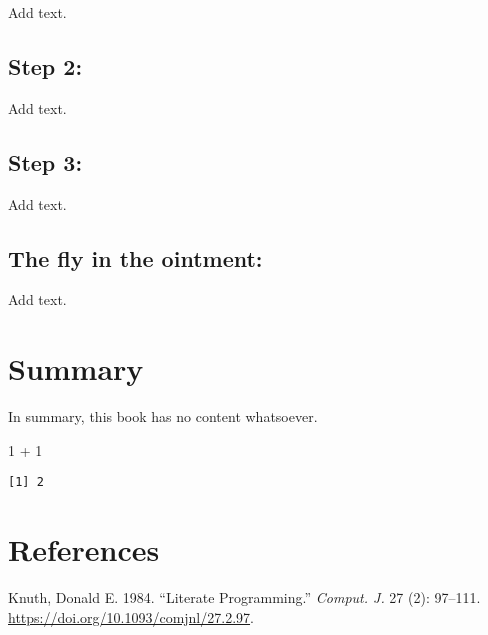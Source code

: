 \documentclass[
  letterpaper,
  DIV=11,
  numbers=noendperiod]{scrreprt}
\newenvironment{Shaded}{\begin{snugshade}}{\end{snugshade}}
\newcommand{\DecValTok}[1]{\textcolor[rgb]{0.68,0.00,0.00}{#1}}
\newcommand{\SpecialCharTok}[1]{\textcolor[rgb]{0.37,0.37,0.37}{#1}}
\newlength{\cslhangindent}
\newenvironment{CSLReferences}[2] %
 {\begin{list}{}{%
  \setlength{\itemindent}{0pt}
  \setlength{\leftmargin}{0pt}
  \setlength{\parsep}{0pt}
  \ifodd #1
   \setlength{\leftmargin}{\cslhangindent}
   \setlength{\itemindent}{-1\cslhangindent}
  \fi
  \setlength{\itemsep}{#2\baselineskip}}}
 {\end{list}}
\begin{document}
Add text.

\section{Step 2:}\label{step-2-2}

Add text.

\section{Step 3:}\label{step-3-2}

Add text.

\section{The fly in the ointment:}\label{the-fly-in-the-ointment-8}

Add text.


\chapter{Summary}\label{summary}

In summary, this book has no content whatsoever.

\begin{Shaded}
\begin{Highlighting}[]
\DecValTok{1} \SpecialCharTok{+} \DecValTok{1}
\end{Highlighting}
\end{Shaded}

\begin{verbatim}
[1] 2
\end{verbatim}


\chapter*{References}\label{references}


\label{refs}
\begin{CSLReferences}{1}{0}
Knuth, Donald E. 1984. {``Literate Programming.''} \emph{Comput. J.} 27
(2): 97--111. \url{https://doi.org/10.1093/comjnl/27.2.97}.

\end{CSLReferences}
\end{document}

